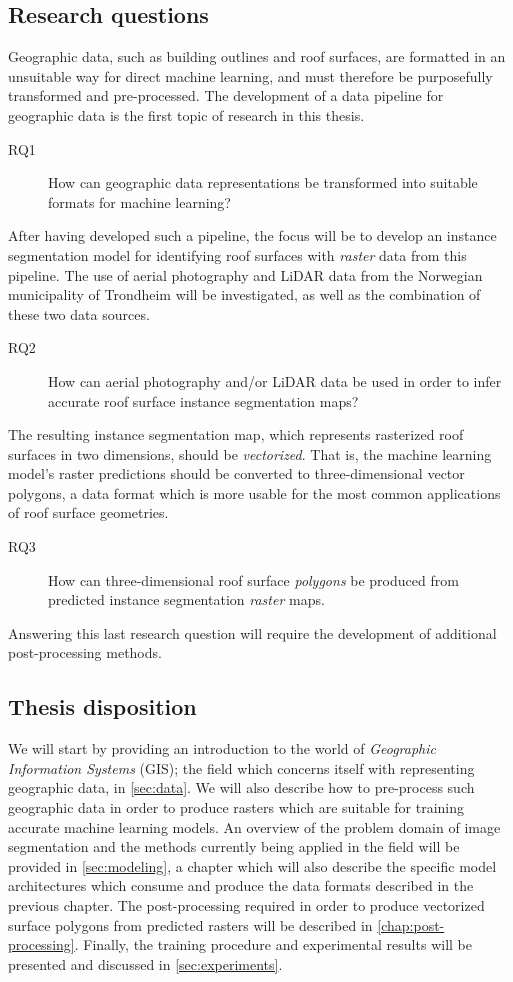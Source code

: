 \subsection*{Research questions}

Geographic data, such as building outlines and roof surfaces, are formatted in an unsuitable way for direct machine learning, and must therefore be purposefully transformed and pre-processed.
The development of a data pipeline for geographic data is the first topic of research in this thesis.
%
\begin{description}
  \item[RQ1] How can geographic data representations be transformed into suitable formats for machine learning?
\end{description}
%
After having developed such a pipeline, the focus will be to develop an instance segmentation model for identifying roof surfaces with \emph{raster} data from this pipeline.
The use of aerial photography and LiDAR data from the Norwegian municipality of Trondheim will be investigated, as well as the combination of these two data sources.
%
\begin{description}
  \item[RQ2] How can aerial photography and/or LiDAR data be used in order to infer accurate roof surface instance segmentation maps?
\end{description}
%
The resulting instance segmentation map, which represents rasterized roof surfaces in two dimensions, should be \emph{vectorized}.
That is, the machine learning model's raster predictions should be converted to three-dimensional vector polygons, a data format which is more usable for the most common applications of roof surface geometries.
%
\begin{description}
  \item[RQ3] How can three-dimensional roof surface \emph{polygons} be produced from predicted instance segmentation \emph{raster} maps.
\end{description}
%
Answering this last research question will require the development of additional post-processing methods.

\subsection*{Thesis disposition}

We will start by providing an introduction to the world of \textit{Geographic Information Systems} (GIS); the field which concerns itself with representing geographic data, in \cref{sec:data}.
We will also describe how to pre-process such geographic data in order to produce rasters which are suitable for training accurate machine learning models.
An overview of the problem domain of image segmentation and the methods currently being applied in the field will be provided in \cref{sec:modeling}, a chapter which will also describe the specific model architectures which consume and produce the data formats described in the previous chapter.
The post-processing required in order to produce vectorized surface polygons from predicted rasters will be described in \cref{chap:post-processing}.
Finally, the training procedure and experimental results will be presented and discussed in \cref{sec:experiments}.
